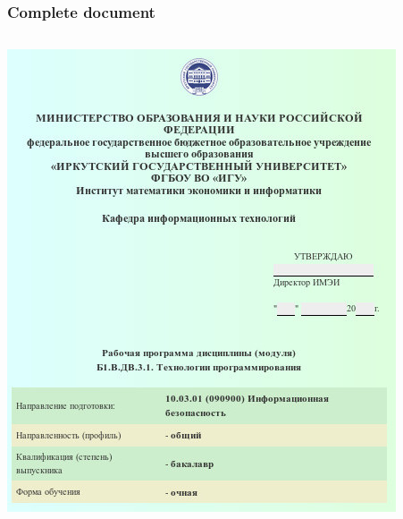 \documentclass[10pt]{beamer}
\begin{document}
\begin{frame}
  \frametitle{Complete document}
  \begin{adjustwidth}{-2.5em}{-2.5em}
    \begin{center}
      \begin{columns}
        \begin{column}{0.5\linewidth}
          \includegraphics[width=1\linewidth]{work-program-title.jpg}
        \end{column}
        \begin{column}{0.5\linewidth}

\end{column}
\end{columns}
\end{center}
\end{adjustwidth}
\end{frame}
\end{document}
